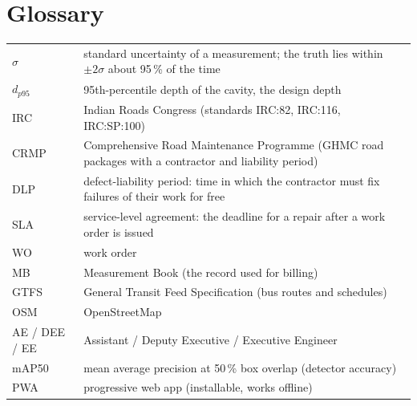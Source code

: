 \documentclass[11pt,a4paper]{article}
\begin{document}
\section{Glossary}
\begin{tabularx}{\textwidth}{@{}l X@{}}
\toprule
$\sigma$ & standard uncertainty of a measurement; the truth lies within $\pm2\sigma$ about 95\,\% of the time\\
$d_{p95}$ & 95th-percentile depth of the cavity, the design depth\\
IRC & Indian Roads Congress (standards IRC:82, IRC:116, IRC:SP:100)\\
CRMP & Comprehensive Road Maintenance Programme (GHMC road packages with a contractor and liability period)\\
DLP & defect-liability period: time in which the contractor must fix failures of their work for free\\
SLA & service-level agreement: the deadline for a repair after a work order is issued\\
WO & work order\\
MB & Measurement Book (the record used for billing)\\
GTFS & General Transit Feed Specification (bus routes and schedules)\\
OSM & OpenStreetMap\\
AE / DEE / EE & Assistant / Deputy Executive / Executive Engineer\\
mAP50 & mean average precision at 50\,\% box overlap (detector accuracy)\\
PWA & progressive web app (installable, works offline)\\
\bottomrule
\end{tabularx}
\end{document}
